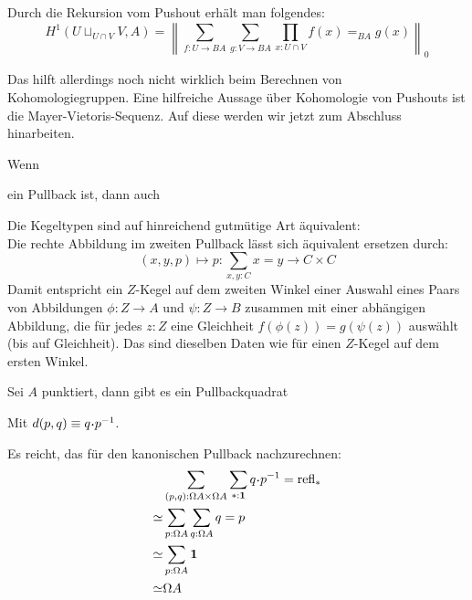 Durch die Rekursion vom Pushout erhält man folgendes:
\[
  H^1(U\sqcup_{U\cap V} V,A)=\left\| \sum_{f:U\to BA}\sum_{g:V\to BA} \prod_{x:U\cap V}f(x)=_{BA}g(x) \right\|_0
\]

Das hilft allerdings noch nicht wirklich beim Berechnen von Kohomologiegruppen.
Eine hilfreiche Aussage über Kohomologie von Pushouts ist die Mayer-Vietoris-Sequenz.
Auf diese werden wir jetzt zum Abschluss hinarbeiten.

\begin{lemma}
  Wenn
  \begin{center}
  \end{center}
  ein Pullback ist, dann auch
  \begin{center}
  \end{center}
\end{lemma}
\begin{beweis}[Idee]
  Die Kegeltypen sind auf hinreichend gutmütige Art äquivalent: \\
  Die rechte Abbildung im zweiten Pullback lässt sich äquivalent ersetzen durch:
  \[
    (x,y,p)\mapsto p: \sum_{x,y:C}x=y\to C\times C
  \]
  Damit entspricht ein $Z$-Kegel auf dem zweiten Winkel einer Auswahl eines Paars von Abbildungen $\phi:Z\to A$ und $\psi:Z\to B$ zusammen mit einer abhängigen Abbildung, die für jedes $z:Z$ eine Gleichheit $f(\phi(z))=g(\psi(z))$ auswählt (bis auf Gleichheit). Das sind dieselben Daten wie für einen $Z$-Kegel auf dem ersten Winkel.
\end{beweis}

\begin{lemma}
  Sei $A$ punktiert, dann gibt es ein Pullbackquadrat
  \begin{center}
  \end{center}
  Mit $d(p,q)\equiv q\kon p^{-1}$.
\end{lemma}
\begin{beweis}
  Es reicht, das für den kanonischen Pullback nachzurechnen:
  \begin{align*}
    &\sum_{(p,q):\Omega A\times \Omega A}\sum_{\ast:\eins} q\kon p^{-1}=\refl_\ast\\
    \simeq & \sum_{p:\Omega A}\sum_{q:\Omega A}q=p \\
    \simeq & \sum_{p:\Omega A}\eins \\
    \simeq & \Omega A
  \end{align*}
\end{beweis}

